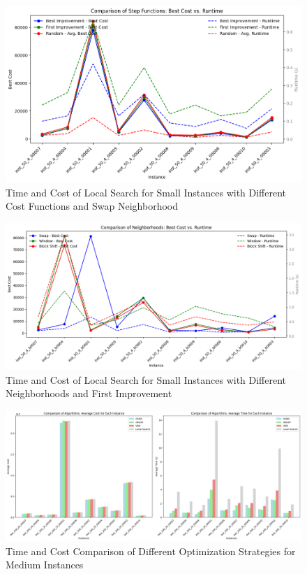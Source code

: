 \documentclass{article}
\begin{document}
\begin{figure}[H]
	\includegraphics[width=\linewidth]{local_search_swap.png}
	\caption{Time and Cost of Local Search for Small Instances with Different Cost Functions and Swap Neighborhood}
\end{figure}

\begin{figure}[H]
	\includegraphics[width=\linewidth]{ls_n.png}
	\caption{Time and Cost of Local Search for Small Instances with Different Neighborhoods and First Improvement}
\end{figure}

\begin{figure}[H]
	\includegraphics[width=\linewidth]{algo_comp.png}
	\caption{Time and Cost Comparison of Different Optimization Strategies for Medium Instances}
\end{figure}
\end{document}

